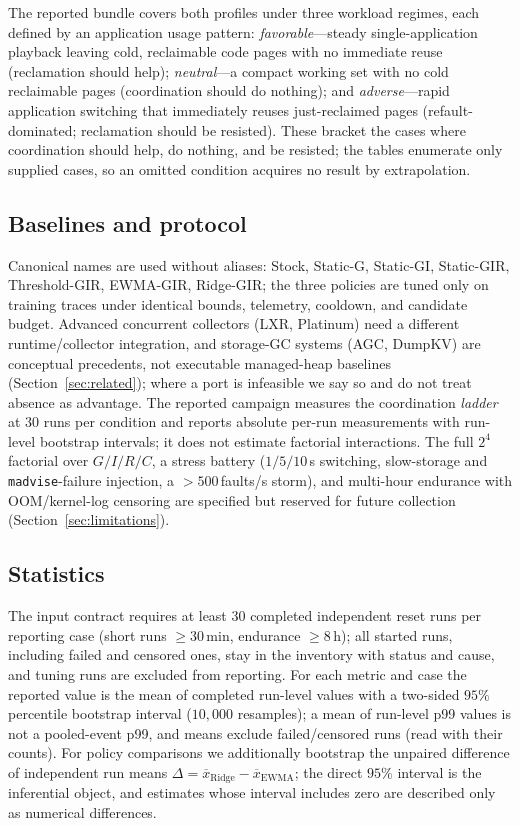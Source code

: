 The reported bundle covers both profiles under three workload regimes, each
defined by an application usage pattern: \emph{favorable}---steady single-application
playback leaving cold, reclaimable code pages with no immediate reuse
(reclamation should help); \emph{neutral}---a compact working set with no cold
reclaimable pages (coordination should do nothing); and \emph{adverse}---rapid
application switching that immediately reuses just-reclaimed pages
(refault-dominated; reclamation should be resisted). These bracket the cases
where coordination should help, do nothing, and be resisted; the tables
enumerate only supplied cases, so an omitted condition acquires no result by
extrapolation.

\subsection{Baselines and protocol}
\label{sec:method-factorial}
Canonical names are used without aliases: \textsf{Stock}, \textsf{Static-G},
\textsf{Static-GI}, \textsf{Static-GIR}, \textsf{Threshold-GIR},
\textsf{EWMA-GIR}, \textsf{Ridge-GIR}; the three policies are tuned only on
training traces under identical bounds, telemetry, cooldown, and candidate
budget. Advanced concurrent collectors (LXR, Platinum) need a different
runtime/collector integration, and storage-GC systems (AGC, DumpKV) are
conceptual precedents, not executable managed-heap baselines
(Section~\ref{sec:related}); where a port is infeasible we say so and do not
treat absence as advantage. The reported campaign measures the coordination
\emph{ladder} at $30$ runs per condition and reports absolute per-run
measurements with run-level bootstrap intervals; it does not estimate factorial
interactions. The full $2^4$ factorial over $G/I/R/C$, a stress battery
($1/5/10$\,s switching, slow-storage and \texttt{madvise}-failure injection, a
$>\!500$\,faults/s storm), and multi-hour endurance with OOM/kernel-log
censoring are specified but reserved for future collection
(Section~\ref{sec:limitations}).

\subsection{Statistics}
The input contract requires at least $30$ completed independent reset runs per
reporting case (short runs $\geq30$\,min, endurance $\geq8$\,h); all started
runs, including failed and censored ones, stay in the inventory with status and
cause, and tuning runs are excluded from reporting. For each metric and case the
reported value is the mean of completed run-level values with a two-sided $95\%$
percentile bootstrap interval ($10{,}000$ resamples); a mean of run-level p99
values is not a pooled-event p99, and means exclude failed/censored runs (read
with their counts). For policy comparisons we additionally bootstrap the unpaired
difference of independent run means
$\Delta=\overline{x}_{\mathrm{Ridge}}-\overline{x}_{\mathrm{EWMA}}$; the direct
$95\%$ interval is the inferential object, and estimates whose interval includes
zero are described only as numerical differences.

